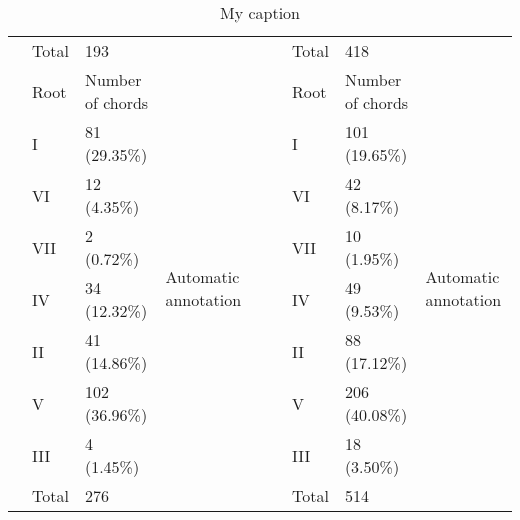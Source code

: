 \begin{table}[]
{\begin{tabular}{|l|l|l|l|l|l|l|l|l|}
 & Total & 193 &  &  &  & Total & 418 &  \\ \cline{2-4} \cline{7-9}
 & Root & Number of chords & \multirow{9}{*}{Automatic annotation} &  &  & Root & Number of chords & \multirow{9}{*}{Automatic annotation} \\ \cline{2-3} \cline{7-8}
 & I & 81 (29.35\%) &  &  &  & I & 101 (19.65\%) &  \\ \cline{2-3} \cline{7-8}
 & VI & 12 (4.35\%) &  &  &  & VI & 42 (8.17\%) &  \\ \cline{2-3} \cline{7-8}
 & VII & 2 (0.72\%) &  &  &  & VII & 10 (1.95\%) &  \\ \cline{2-3} \cline{7-8}
 & IV & 34 (12.32\%) &  &  &  & IV & 49 (9.53\%) &  \\ \cline{2-3} \cline{7-8}
 & II & 41 (14.86\%) &  &  &  & II & 88 (17.12\%) &  \\ \cline{2-3} \cline{7-8}
 & V & 102 (36.96\%) &  &  &  & V & 206 (40.08\%) &  \\ \cline{2-3} \cline{7-8}
 & III & 4 (1.45\%) &  &  &  & III & 18 (3.50\%) &  \\ \cline{2-3} \cline{7-8}
 & Total & 276 &  &  &  & Total & 514 &  \\ \cline{1-4} \cline{6-9}
\end{tabular}
}
\caption{My caption}
\label{my-label}
\end{table}



